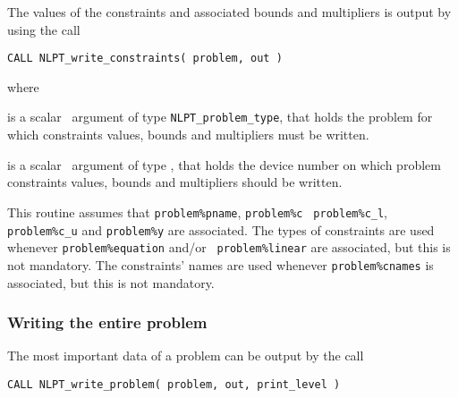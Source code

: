 \documentclass{galahad}
\newcommand{\packagename}{NLPT}
\begin{document}
The values of the constraints and associated bounds and multipliers is output
by using the call
\vspace*{1mm}

\hspace{8mm}
{\tt CALL \packagename\_write\_constraints( problem, out )}

\noindent where
\begin{description}
 is a scalar \intentin\ argument of type {\tt NLPT\_problem\_type},
that holds the problem for which constraints values, bounds and multipliers
must be written.

 is a scalar \intentin\ argument of type \integer, that
holds the device number on which problem constraints values, bounds and
multipliers should be written.
\end{description}

\noindent
This routine assumes that {\tt problem\%pname}, {\tt problem\%c} {\tt
problem\%c\_l}, {\tt problem\%c\_u} and {\tt problem\%y} are associated.  The
types of constraints are used whenever {\tt problem\%equation} and/or {\tt
problem\%linear} are associated, but this is not mandatory.  The constraints'
names are used whenever {\tt problem\%cnames} is associated, but this is not
mandatory.

\subsubsection{Writing the entire problem}
\label{w_prob}

The most important data of a problem can be output by the call
\vspace*{1mm}

\hspace{8mm}
{\tt CALL \packagename\_write\_problem( problem, out, print\_level )}
\end{document}
